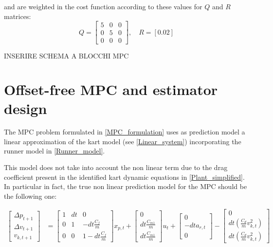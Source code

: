 \documentclass[a4paper,12pt,oneside]{book}
\begin{document}
and are weighted in the cost function according to these values for $Q$ and $R$ matrices:
\begin{equation}
    Q =
    \begin{bmatrix}
        5 & 0 & 0 \\
        0 & 5 & 0 \\
        0 & 0 & 0
    \end{bmatrix},
    \quad
    R = [0.02]    
\end{equation}

INSERIRE SCHEMA A BLOCCHI MPC


\section{Offset-free MPC and estimator design}
The MPC problem formulated in \ref{MPC_formulation} uses as prediction model a linear approximation of the kart model (see \ref{Linear_system}) incorporating the runner model in \ref{Runner_model}.

This model does not take into account the non linear term due to the drag coefficient present in the identified kart dynamic equations in \ref{Plant_simplified}.
In particular in fact, the true non linear prediction model for the MPC should be the following one:

\begin{equation}
\begin{aligned}
    \begin{bmatrix}
        \Delta p_{t+1}  \\
        \Delta v_{t+1} \\
        v_{k,t+1}
    \end{bmatrix}
    & =
    \begin{bmatrix}
        1 & dt & 0 \\
        0 & 1 & -dt\frac{C_f}{m} \\
        0 & 0 & 1-dt\frac{C_f}{m}
    \end{bmatrix}
    x_{p,t}
    +
    \begin{bmatrix}
        0 \\
        dt \frac{C_{m1}}{m} \\
        dt \frac{C_{m1}}{m}
    \end{bmatrix}
    u_t + 
    \begin{bmatrix}
    0 \\
    - dt a_{r,t} \\
    0
    \end{bmatrix} 
    -
    \begin{bmatrix}
    0 \\
    dt (\frac{C_{d}}{m} v_{k,t}^2) \\
    dt (\frac{C_{d}}{m} v_{k,t}^2)
    \end{bmatrix}
\end{aligned}
\label{Non-lin_prediction_model_MPC}
\end{equation}
\end{document}

